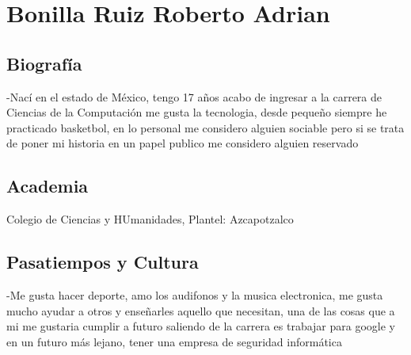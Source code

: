\chapter{Bonilla Ruiz Roberto Adrian}

\section{Biografía}
 -Nací en el estado de México, tengo 17 años acabo de ingresar a la carrera de Ciencias de la Computación
    me gusta la tecnologia, desde pequeño siempre he practicado basketbol, en lo personal me considero alguien sociable pero si se trata de poner mi historia en un papel publico me considero alguien reservado

\section{Academia}
Colegio de Ciencias y HUmanidades, Plantel: Azcapotzalco

\section{Pasatiempos y Cultura}
-Me gusta hacer deporte, amo los audifonos y la musica electronica, me gusta mucho ayudar a otros y enseñarles aquello que necesitan, una de las cosas que a mi me gustaria cumplir a futuro saliendo de la carrera es trabajar para google y en un futuro más lejano, tener una empresa de seguridad informática 
